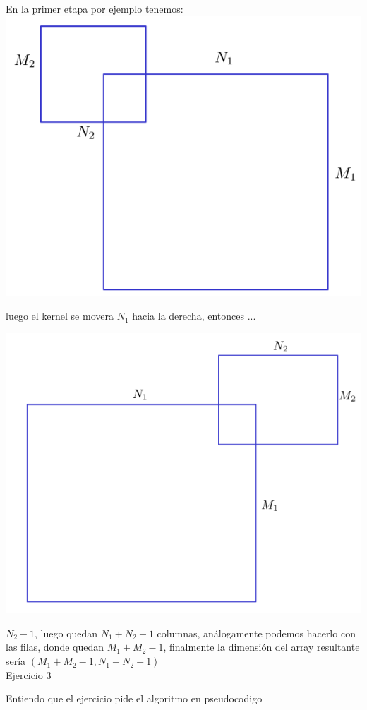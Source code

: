 \documentclass[11pt]{article}
\begin{document}
En la primer etapa por ejemplo tenemos: \\

\includegraphics[width=0.3\linewidth]{etapa1.png} 

luego el kernel se movera $N_1$ hacia la derecha, entonces ...

\includegraphics[width=0.3\linewidth]{etapa2.png} 

$N_2 - 1$, luego quedan $N_1 + N_2 - 1$ columnas, análogamente podemos hacerlo con las filas, donde quedan $M_1 + M_2 - 1$, finalmente la dimensión del array resultante sería $(M_1 + M_2 - 1,N_1 + N_2 - 1)$ \\

Ejercicio 3 

Entiendo que el ejercicio pide el algoritmo en pseudocodigo \\
\end{document}
